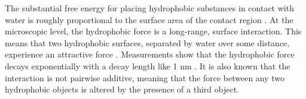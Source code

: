 The substantial free energy for placing hydrophobic substances in contact with water 
is roughly proportional to the surface area of the contact region \cite{Bjorneholm2016}.  
At the microscopic level, the hydrophobic force is a long-range, surface interaction. 
This means that two hydrophobic surfaces, separated by
water over some distance, experience an attractive force \cite{Lum1999,Meyer2006,Hammer2010}.
Measurements show that the hydrophobic force
decays exponentially with a decay length like 1 nm 
\cite{Israelachvili1984, Marcelja1977,Christenson2001,Lin2005}. It is also known that the interaction is not pairwise additive, meaning that the force
between any two hydrophobic objects is altered by the presence of a third  object. 

